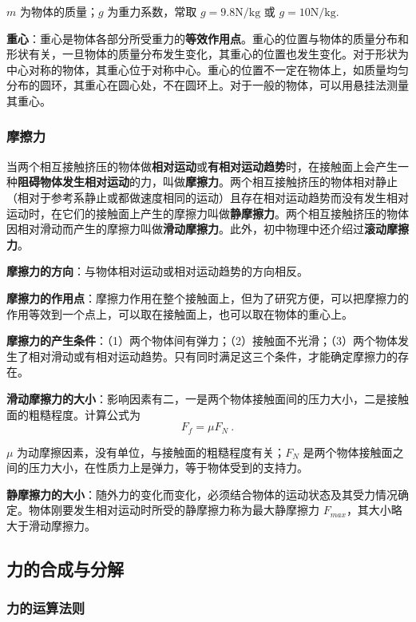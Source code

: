 $m$ 为物体的质量；$g$ 为重力系数，常取 $g=9.8\mathrm{N/kg}$ 或 $g=\mathrm{10N/kg}$.

\textbf{重心}：重心是物体各部分所受重力的\textbf{等效作用点}。重心的位置与物体的质量分布和形状有关，一旦物体的质量分布发生变化，其重心的位置也发生变化。对于形状为中心对称的物体，其重心位于对称中心。重心的位置不一定在物体上，如质量均匀分布的圆环，其重心在圆心处，不在圆环上。对于一般的物体，可以用悬挂法测量其重心。


\subsubsection{摩擦力}
当两个相互接触挤压的物体做\textbf{相对运动}或\textbf{有相对运动趋势}时，在接触面上会产生一种\textbf{阻碍物体发生相对运动}的力，叫做\textbf{摩擦力}。两个相互接触挤压的物体相对静止（相对于参考系静止或都做速度相同的运动）且存在相对运动趋势而没有发生相对运动时，在它们的接触面上产生的摩擦力叫做\textbf{静摩擦力}。两个相互接触挤压的物体因相对滑动而产生的摩擦力叫做\textbf{滑动摩擦力}。此外，初中物理中还介绍过\textbf{滚动摩擦力}。

\textbf{摩擦力的方向}：与物体相对运动或相对运动趋势的方向相反。

\textbf{摩擦力的作用点}：摩擦力作用在整个接触面上，但为了研究方便，可以把摩擦力的作用等效到一个点上，可以取在接触面上，也可以取在物体的重心上。

\textbf{摩擦力的产生条件}：（1）两个物体间有弹力；（2）接触面不光滑；（3）两个物体发生了相对滑动或有相对运动趋势。只有同时满足这三个条件，才能确定摩擦力的存在。

\textbf{滑动摩擦力的大小}：影响因素有二，一是两个物体接触面间的压力大小，二是接触面的粗糙程度。计算公式为
\begin{equation}
F_f=\mu F_N~.
\end{equation}

$\mu$ 为动摩擦因素，没有单位，与接触面的粗糙程度有关；$F_N$ 是两个物体接触面之间的压力大小，在性质力上是弹力，等于物体受到的支持力。

\textbf{静摩擦力的大小}：随外力的变化而变化，必须结合物体的运动状态及其受力情况确定。物体刚要发生相对运动时所受的静摩擦力称为最大静摩擦力 $F_{max}$，其大小略大于滑动摩擦力。

\subsection{力的合成与分解}
\subsubsection{力的运算法则}

